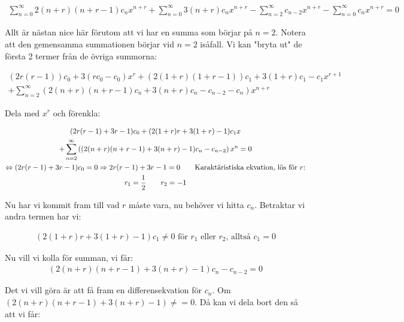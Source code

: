 \begin{equation*}
  \begin{gathered}
    \sum_{n=0}^{\infty}2(n+r)(n+r-1)c_nx^{n+r}+\sum_{n=0}^{\infty}3(n+r)c_nx^{n+r}-\sum_{n=2}^{\infty}c_{n-2}x^{n+r}-\sum_{n=0}^{\infty}c_nx^{n+r}=0
  \end{gathered}
\end{equation*}\par
\noindent Allt är nästan nice här förutom att vi har en summa som börjar på $n=2$. Notera att den gemensamma summationen börjar vid $n=2$ isåfall. Vi kan "bryta ut" de första 2 termer från de övriga summorna:
\par\bigskip
\begin{equation*}
  \begin{gathered}
    (2r(r-1))c_0+3(rc_0-c_0)x^r+(2(1+r)(1+r-1))c_1+3(1+r)c_1-c_1x^{r+1}\\
    +\sum_{n=2}^{\infty}\left(2(n+r)(n+r-1)c_n+3(n+r)c_n-c_{n-2}-c_n\right)x^{n+r}
  \end{gathered}
\end{equation*}
\par\bigskip
\noindent Dela med $x^r$ och förenkla:

\begin{equation*}
  \begin{gathered}
    (2r(r-1)+3r-1)c_0+(2(1+r)r+3(1+r)-1)c_1x\\
    +\sum_{n=2}^{\infty}\left((2(n+r)(n+r-1)+3(n+r)-1)c_n-c_{n-2}\right)x^n=0\\
    \Leftrightarrow (2r(r-1)+3r-1)c_0 = 0 \Rightarrow 2r(r-1)+3r-1 = 0 \text{\qquad Karaktäristiska ekvation, lös för $r$:}\\
    r_1 = \dfrac{1}{2}\qquad r_2=-1
  \end{gathered}
\end{equation*}
\par\bigskip
\noindent Nu har vi kommit fram till vad $r$ måste vara, nu behöver vi hitta $c_n$. Betraktar vi andra termen har vi:

\begin{equation*}
  \begin{gathered}
    (2(1+r)r+3(1+r)-1)c_1\neq0 \text{ för $r_1$ eller $r_2$, alltså $c_1=0$}
  \end{gathered}
\end{equation*}
\par\bigskip
\noindent Nu vill vi kolla för summan, vi får:
\begin{equation*}
  \begin{gathered}
    (2(n+r)(n+r-1)+3(n+r)-1)c_n-c_{n-2}=0
  \end{gathered}
\end{equation*}
\par\bigskip
\noindent Det vi vill göra är att få fram en differensekvation för $c_n$. Om $(2(n+r)(n+r-1)+3(n+r)-1)\neq=0$. Då kan vi dela bort den så att vi får:

